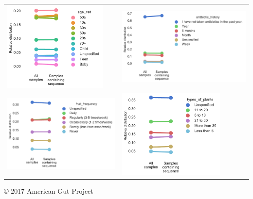 \documentclass[10pt]{amsart}
\begin{document}
\begin{raggedright}
\begin{tabular}{L{6.5cm} L{6.5cm}}
\includegraphics[height=4.5cm]{age_cat.pdf} & 
\includegraphics[height=4.5cm]{antibiotic_history.pdf}\\ 
\includegraphics[height=4.5cm]{fruit_frequency.pdf} &
\includegraphics[height=4.5cm]{types_of_plants.pdf}
\end{tabular}

\end{raggedright}


\begin{center}
	\copyright{} 2017 American Gut Project
\end{center}

\end{document}
